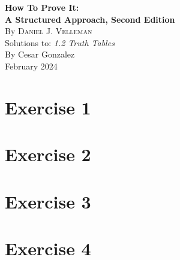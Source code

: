 \documentclass[letterpaper,12pt]{article}
\begin{document}
\pagestyle{fancy}
\setlength{\headheight}{15pt}
\begin{flushleft}

\begin{center}

    {\Large\textbf{How To Prove It:}\\[0.2em] %
    \Large\textbf{A Structured Approach, Second Edition}}\\[1.5em]

    {\normalsize By \textsc{Daniel J. Velleman}}\\[1.5em]

    Solutions to: \textit{1.2 Truth Tables}\\[1.5em]

    By Cesar Gonzalez\\[0.5em]
    February 2024
\end{center}

\pagebreak
\tableofcontents
\newpage

\section*{Exercise 1}


\section*{Exercise 2}


\section*{Exercise 3}


\section*{Exercise 4}



\end{flushleft}
\end{document}
